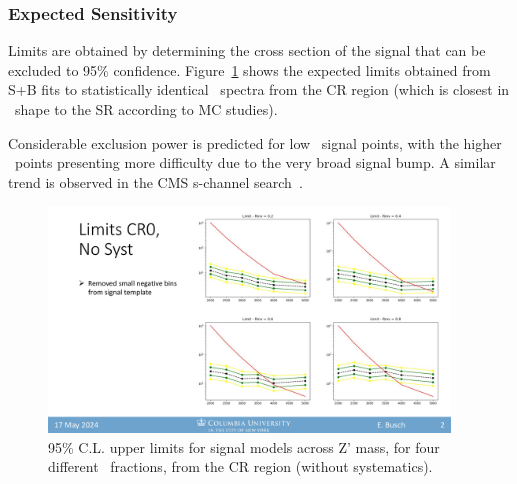 \subsubsection{Expected Sensitivity}
\label{subsec:fit_expsens}

Limits are obtained by determining the cross section of the signal that can be excluded to 95\% confidence. 
Figure~\ref{fig:limits_exp_1D} shows the expected limits obtained from S+B fits to statistically identical \mt~spectra from the CR region (which is closest in \mt~shape to the SR according to MC studies). 

Considerable exclusion power is predicted for low \rinv~signal points, with the higher \rinv~points presenting more difficulty due to the very broad signal bump. 
A similar trend is observed in the CMS s-channel search~\cite{cms_schan}.

\begin{figure}[!htbp]
\centering
   \includegraphics[width=0.95\textwidth]{figures/stats/limits_exp_1D}
    \caption{95\% C.L. upper limits for signal models across Z' mass, for four different \rinv~fractions, from the CR region (without systematics).
    \label{fig:limits_exp_1D}}
\end{figure}

